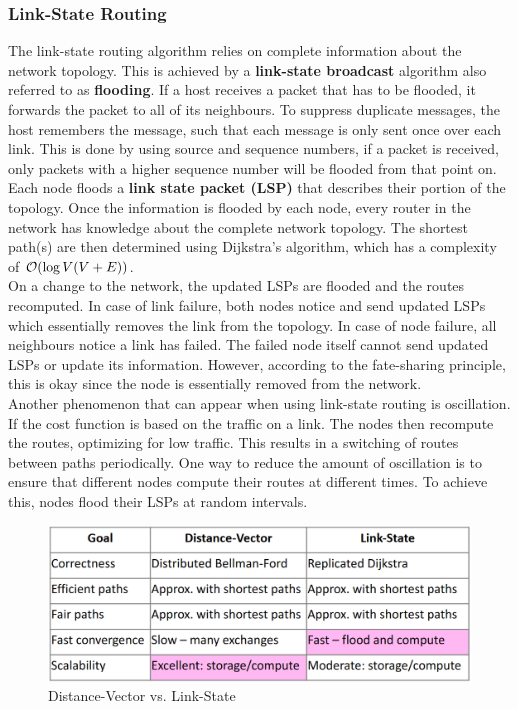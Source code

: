 \subsubsection{Link-State Routing}
The link-state routing algorithm relies on complete information about the network topology. This is achieved by a \textbf{link-state broadcast} algorithm also referred to as \textbf{flooding}. If a host receives a packet that has to be flooded, it forwards the packet to all of its neighbours. To suppress duplicate messages, the host remembers the message, such that each message is only sent once over each link. This is done by using source and sequence numbers, if a packet is received, only packets with a higher sequence number will be flooded from that point on. \vspace{.3cm}\\

Each node floods a \textbf{link state packet (LSP)} that describes their portion of the topology. Once the information is flooded by each node, every router in the network has knowledge about the complete network topology. The shortest path(s) are then determined using Dijkstra's algorithm, which has a complexity of $\mathcal{O}(\log V(V + E))$.\vspace{.3cm}\\

On a change to the network, the updated LSPs are flooded and the routes recomputed. In case of link failure, both nodes notice and send updated LSPs which essentially removes the link from the topology. In case of node failure, all neighbours notice a link has failed. The failed node itself cannot send updated LSPs or update its information. However, according to the fate-sharing principle, this is okay since the node is essentially removed from the network.\vspace{.3cm}\\

Another phenomenon that can appear when using link-state routing is oscillation. If the cost function is based on the traffic on a link. The nodes then recompute the routes, optimizing for low traffic. This results in a switching of routes between paths periodically. One way to reduce the amount of oscillation is to ensure that different nodes compute their routes at different times. To achieve this, nodes flood their LSPs at random intervals.\vspace{.2cm}\\

\begin{figure}
\centering
\includegraphics[width=.8\textwidth]{images/dvls.PNG}
\caption{Distance-Vector vs. Link-State}
\label{dvls}
\end{figure}

